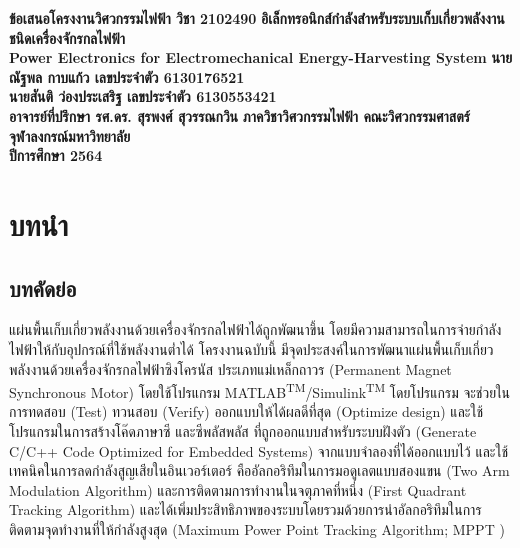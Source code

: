 \documentclass[11pt,a4paper]{article}
\begin{document}
\thispagestyle{empty}
\begin{center}
    \doublespacing
    {\LARGE \bf ข้อเสนอโครงงานวิศวกรรมไฟฟ้า วิชา 2102490}
    \vfill
    {
        \LARGE \bf
        อิเล็กทรอนิกส์กำลังสำหรับระบบเก็บเกี่ยวพลังงานชนิดเครื่องจักรกลไฟฟ้า \\[2ex]
        Power Electronics for Electromechanical Energy-Harvesting System
    }
    \vfill
    {\LARGE \bf นายณัฐพล กาบแก้ว เลขประจำตัว 6130176521}\\[2ex]
    {\LARGE \bf นายสันติ ว่องประเสริฐ เลขประจำตัว 6130553421}\\[2ex]
    {\LARGE \bf อาจารย์ที่ปรึกษา รศ.ดร. สุรพงศ์ สุวรรณกวิน}
    \vfill
    {\LARGE \bf ภาควิชาวิศวกรรมไฟฟ้า คณะวิศวกรรมศาสตร์}\\[2ex]
    {\LARGE \bf จุฬาลงกรณ์มหาวิทยาลัย}\\[2ex]
    {\LARGE \bf ปีการศึกษา 2564}
\end{center}

\newpage
\thispagestyle{empty}
\tableofcontents

\newpage
\setcounter{page}{1}
\section{บทนำ}
\subsection{บทคัดย่อ}
แผ่นพื้นเก็บเกี่ยวพลังงานด้วยเครื่องจักรกลไฟฟ้าได้ถูกพัฒนาขึ้น โดยมีความสามารถในการจ่ายกำลังไฟฟ้าให้กับอุปกรณ์ที่ใช้พลังงานต่ำได้ โครงงานฉบับนี้ มีจุดประสงค์ในการพัฒนาแผ่นพื้นเก็บเกี่ยวพลังงานด้วยเครื่องจักรกลไฟฟ้าซิงโครนัส ประเภทแม่เหล็กถาวร (Permanent Magnet Synchronous Motor) โดยใช้โปรแกรม MATLAB\textsuperscript{TM}/Simulink\textsuperscript{TM} โดยโปรแกรม จะช่วยในการทดสอบ (Test) ทวนสอบ (Verify) ออกแบบให้ได้ผลดีที่สุด (Optimize design) และใช้โปรแกรมในการสร้างโค๊ดภาษาซี และซีพลัสพลัส ที่ถูกออกแบบสำหรับระบบฝังตัว (Generate C/C++ Code Optimized for Embedded Systems)  จากแบบจำลองที่ได้ออกแบบไว้ และใช้เทคนิคในการลดกำลังสูญเสียในอินเวอร์เตอร์ คืออัลกอริทึมในการมอดูเลตแบบสองแขน (Two Arm Modulation Algorithm) และการติดตามการทำงานในจตุภาคที่หนึ่ง (First Quadrant Tracking Algorithm) และได้เพิ่มประสิทธิภาพของระบบโดยรวมด้วยการนำอัลกอริทึมในการติดตามจุดทำงานที่ให้กำลังสูงสุด (Maximum Power Point Tracking Algorithm; MPPT )
\end{document}
